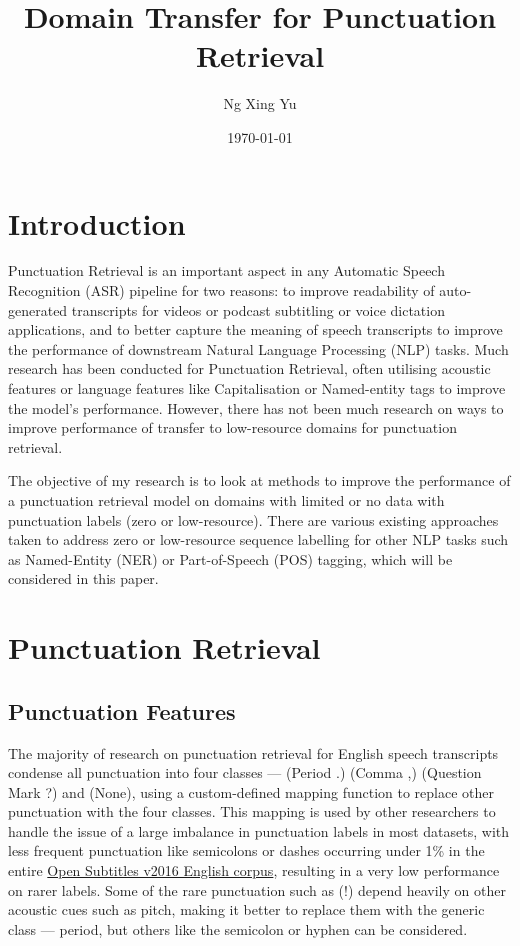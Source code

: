 \documentclass[a4paper]{article}
\title{Domain Transfer for Punctuation Retrieval}
\date{\today{}}
\author{Ng Xing Yu}
\begin{document}
\maketitle
\begin{multicols}{2}
\tableofcontents

\section{Introduction}
Punctuation Retrieval is an important aspect in any Automatic Speech Recognition (ASR) pipeline for two reasons: to improve readability of auto-generated transcripts for videos or podcast subtitling or voice dictation applications, and to better capture the meaning of speech transcripts to improve the performance of downstream Natural Language Processing (NLP) tasks. Much research has been conducted for Punctuation Retrieval, often utilising acoustic features or language features like Capitalisation or Named-entity tags to improve the model's performance. However, there has not been much research on ways to improve performance of transfer to low-resource domains for punctuation retrieval.

The objective of my research is to look at methods to improve the performance of a punctuation retrieval model on domains with limited or no data with punctuation labels (zero or low-resource). There are various existing approaches taken to address zero or low-resource sequence labelling for other NLP tasks such as Named-Entity (NER) or Part-of-Speech (POS) tagging, which will be considered in this paper.

\section{Punctuation Retrieval}
\subsection{Punctuation Features}
The majority of research on punctuation retrieval for English speech transcripts condense all punctuation into four classes --- (Period .) (Comma ,) (Question Mark ?) and (None), using a custom-defined mapping function to replace other punctuation with the four classes. This mapping is used by other researchers to handle the issue of a large imbalance in punctuation labels in most datasets, with less frequent punctuation like semicolons or dashes occurring under 1\% in the entire \href{http://opus.nlpl.eu/OpenSubtitles-v2016.php}{Open Subtitles v2016 English corpus}, resulting in a very low performance on rarer labels. Some of the rare punctuation such as (!) depend heavily on other acoustic cues such as pitch, making it better to replace them with the generic class --- period, but others like the semicolon or hyphen can be considered.


\end{multicols}
\end{document}
